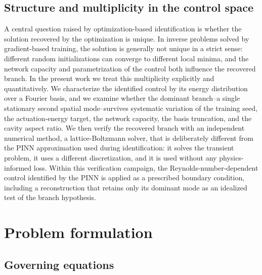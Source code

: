 \documentclass[aip,pof,reprint,superscriptaddress]{revtex4-2}
\begin{document}
\subsection{Structure and multiplicity in the control space}

A central question raised by optimization-based identification is whether the solution recovered by the optimization is unique. In inverse problems solved by gradient-based training, the solution is generally not unique in a strict sense: different random initializations can converge to different local minima, and the network capacity and parametrization of the control both influence the recovered branch. In the present work we treat this multiplicity explicitly and quantitatively. We characterize the identified control by its energy distribution over a Fourier basis, and we examine whether the dominant branch--a single stationary second spatial mode--survives systematic variation of the training seed, the actuation-energy target, the network capacity, the basis truncation, and the cavity aspect ratio. We then verify the recovered branch with an independent numerical method, a lattice-Boltzmann solver, that is deliberately different from the PINN approximation used during identification: it solves the transient problem, it uses a different discretization, and it is used without any physics-informed loss. Within this verification campaign, the Reynolds-number-dependent control identified by the PINN is applied as a prescribed boundary condition, including a reconstruction that retains only its dominant mode as an idealized test of the branch hypothesis.

\section{Problem formulation}\label{sec:problem}

\subsection{Governing equations}
\end{document}
